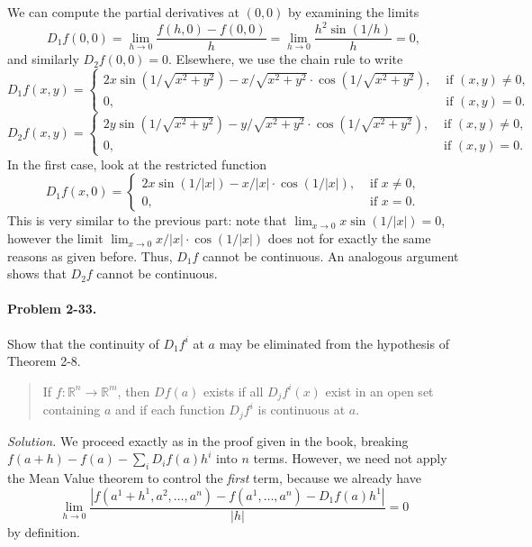 \documentclass[11pt]{report}
\newcommand{\R}{\mathbb{R}}
\newcommand{\problem}[1]{\paragraph{Problem #1.}}
\newcommand{\solution}{\noindent\textit{Solution.} }
\begin{document}
\begin{enumerate}
        We can compute the partial derivatives at $(0, 0)$ by examining the
        limits \[
            D_1f(0, 0) = \lim_{h \to 0} \frac{f(h, 0) - f(0, 0)}{h} = \lim_{h \to 0}
            \frac{h^2\sin(1 / h)}{h} = 0,
        \] and similarly $D_2f(0, 0) = 0$. Elsewhere, we use the chain rule to write
        \[
            D_1f(x, y) = \begin{cases}
                2x\sin(1 / \sqrt{x^2 + y^2}) - x/ \sqrt{x^2 + y^2}\cdot\cos(1 /
                \sqrt{x^2 + y^2}), &\text{ if } (x, y) \neq 0, \\
                0, &\text{ if } (x, y) = 0.
            \end{cases}
        \] 
        \[
            D_2f(x, y) = \begin{cases}
                2y\sin(1 / \sqrt{x^2 + y^2}) - y/ \sqrt{x^2 + y^2}\cdot \cos(1 /
                \sqrt{x^2 + y^2}), &\text{ if } (x, y) \neq 0, \\
                0, &\text{ if } (x, y) = 0.
            \end{cases}
        \] In the first case, look at the restricted function \[
            D_1f(x, 0) = \begin{cases}
                2x\sin(1 / |x|) - x/ |x|\cdot\cos(1 / |x|), &\text{ if } x \neq 0, \\
                0, &\text{ if } x = 0.
            \end{cases}
        \] This is very similar to the previous part: note that $\lim_{x \to 0}
        x\sin(1 / |x|) = 0$, however the limit $\lim_{x \to 0} x / |x| \cdot \cos(1 /
        |x|)$ does not for exactly the same reasons as given before. Thus, $D_1f$
        cannot be continuous. An analogous argument shows that $D_2f$ cannot be
        continuous.
    \end{enumerate}


    \problem{2-33} Show that the continuity of $D_1f^i$ at $a$ may be eliminated from
    the hypothesis of Theorem 2-8. 
    \begin{quote}
        If $f\colon \R^n \to \R^m$, then $Df(a)$ exists if all $D_jf^i(x)$ exist in
        an open set containing $a$ and if each function $D_jf^i$ is continuous at
        $a$.
    \end{quote}

    \solution We proceed exactly as in the proof given in the book, breaking $f(a +
    h) - f(a) - \sum_i D_if(a)h^i$ into $n$ terms. However, we need not apply the
    Mean Value theorem to control the \emph{first} term, because we already have \[
        \lim_{h \to 0} \frac{|f(a^1 + h^1, a^2, \dots, a^n) - f(a^1, \dots, a^n) -
        D_1f(a)h^1|}{|h|} = 0
    \] by definition.
\end{document}
